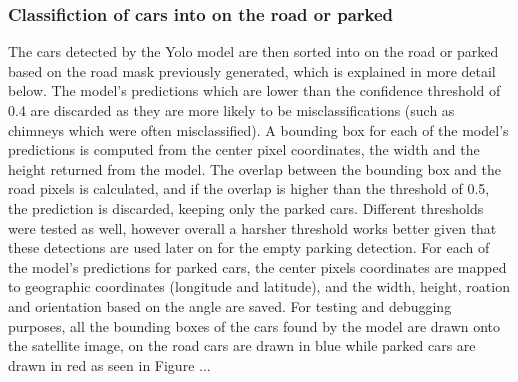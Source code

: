\subsubsection{Classifiction of cars into on the road or parked}
The cars detected by the Yolo model are then sorted into on the road or parked based on the road mask previously generated, which is explained in more detail below.
The model's predictions which are lower than the confidence threshold of 0.4 are discarded as they are more likely to be misclassifications (such as chimneys which were often misclassified).
A bounding box for each of the model's predictions is computed from the center pixel coordinates, the width and the height returned from the model.
The overlap between the bounding box and the road pixels is calculated, and if the overlap is higher than the threshold of 0.5, the prediction is discarded, keeping only the parked cars.
Different thresholds were tested as well, however overall a harsher threshold works better given that these detections are used later on for the empty parking detection.
For each of the model's predictions for parked cars, the center pixels coordinates are mapped to geographic coordinates (longitude and latitude), and the width, height, roation and orientation based on the angle are saved.
For testing and debugging purposes, all the bounding boxes of the cars found by the model are drawn onto the satellite image, on the road cars are drawn in blue while parked cars are drawn in red as seen in Figure ...

